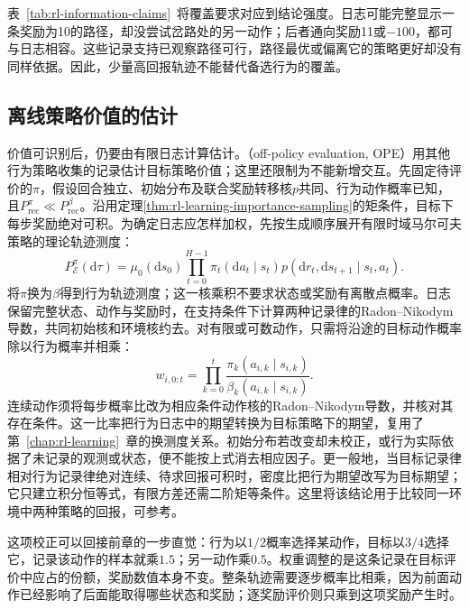 表~\ref{tab:rl-information-claims}~将覆盖要求对应到结论强度。日志可能完整显示一条奖励为10的路径，却没尝试岔路处的另一动作；后者通向奖励11或$-100$，都可与日志相容。这些记录支持已观察路径可行，路径最优或偏离它的策略更好却没有同样依据。因此，少量高回报轨迹不能替代备选行为的覆盖。

\subsection{离线策略价值的估计}
\label{sec:rl-information-estimators}

价值可识别后，仍要由有限日志计算估计。（off-policy evaluation, OPE）用其他行为策略收集的记录估计目标策略价值；这里还限制为不能新增交互。先固定待评价的$\pi$，假设回合独立、初始分布及联合奖励转移核$p$共同、行为动作概率已知，且$P_{\mathrm{rec}}^\pi\ll P_{\mathrm{rec}}^\beta$。沿用定理\ref{thm:rl-learning-importance-sampling}的矩条件，目标下每步奖励绝对可积。为确定日志应怎样加权，先按生成顺序展开有限时域马尔可夫策略的理论轨迹测度：
\[
  P_{\mathcal E}^\pi(\mathrm d\tau)=\mu_0(\mathrm ds_0)
       \prod_{t=0}^{H-1}
       \pi_t(\mathrm da_t\mid s_t)p(\mathrm dr_t,\mathrm ds_{t+1}\mid s_t,a_t).
\]
将$\pi$换为$\beta$得到行为轨迹测度；这一核乘积不要求状态或奖励有离散点概率。日志保留完整状态、动作与奖励时，在支持条件下计算两种记录律的Radon--Nikodym导数，共同初始核和环境核约去。对有限或可数动作，只需将沿途的目标动作概率除以行为概率并相乘：
\begin{equation}
  \label{eq:rl-information-weights}
  w_{i,0:t}=\prod_{k=0}^{t}
       \frac{\pi_k(a_{i,k}\mid s_{i,k})}
            {\beta_k(a_{i,k}\mid s_{i,k})}.
\end{equation}
连续动作须将每步概率比改为相应条件动作核的Radon--Nikodym导数，并核对其存在条件。这一比率把行为日志中的期望转换为目标策略下的期望，复用了第~\ref{chap:rl-learning}~章的换测度关系。初始分布若改变却未校正，或行为实际依据了未记录的观测或状态，便不能按上式消去相应因子。更一般地，当目标记录律相对行为记录律绝对连续、待求回报可积时，密度比把行为期望改写为目标期望；它只建立积分恒等式，有限方差还需二阶矩等条件。这里将该结论用于比较同一环境中两种策略的回报，可参考。

这项校正可以回接前章的一步直觉：行为以$1/2$概率选择某动作，目标以$3/4$选择它，记录该动作的样本就乘$1.5$；另一动作乘$0.5$。权重调整的是这条记录在目标评价中应占的份额，奖励数值本身不变。整条轨迹需要逐步概率比相乘，因为前面动作已经影响了后面能取得哪些状态和奖励；逐奖励评价则只乘到这项奖励产生时。

